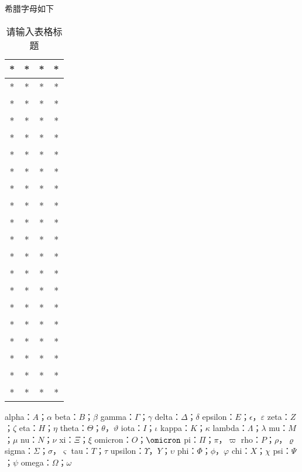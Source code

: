 
\begin{issues}
\issueDraft
\end{issues}


希腊字母如下
\begin{table}[ht]
\centering
\caption{请输入表格标题}\label{tab_GreekL1}
\begin{tabular}{|c|c|c|c|}
\hline
* & * & * & * \\
\hline
* & * & * & * \\
\hline
* & * & * & * \\
\hline
* & * & * & * \\
\hline
* & * & * & * \\
\hline
* & * & * & * \\
\hline
* & * & * & * \\
\hline
* & * & * & * \\
\hline
* & * & * & * \\
\hline
* & * & * & * \\
\hline
* & * & * & * \\
\hline
* & * & * & * \\
\hline
* & * & * & * \\
\hline
* & * & * & * \\
\hline
* & * & * & * \\
\hline
* & * & * & * \\
\hline
* & * & * & * \\
\hline
* & * & * & * \\
\hline
* & * & * & * \\
\hline
* & * & * & * \\
\hline
\end{tabular}
\end{table}
alpha：$A$；$\alpha$
beta：$B$；$\beta$
gamma：$\Gamma$；$\gamma$
delta：$\Delta$；$\delta$
epsilon：$E$；$\epsilon$，$\varepsilon$
zeta：$Z$；$\zeta$
eta：$H$；$\eta$
theta：$\Theta$；$\theta$，$\vartheta$
iota：$I$；$\iota$
kappa：$K$；$\kappa$
lambda：$\Lambda$；$\lambda$
mu：$M$；$\mu$
nu：$N$；$\nu$
xi：$\Xi$；$\xi$
omicron：$O$；$\omicron$
pi：$\Pi$；$\pi$，$\varpi$
rho：$P$；$\rho$，$\varrho$
sigma：$\Sigma$；$\sigma$，$\varsigma$
tau：$T$；$\tau$
upsilon：$\Upsilon$，$Y$；$\upsilon$
phi：$\Phi$；$\phi$，$\varphi$
chi：$X$；$\chi$
psi：$\Psi$；$\psi$
omega：$\Omega$；$\omega$